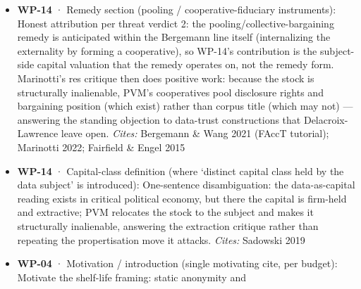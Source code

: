\documentclass[
  11pt,
]{article}
\begin{document}
\begin{itemize}
  partially vindicating the ban pole formally (Acemoglu et al.); firms
  exploit externalities via designed disclosure (Ichihashi); refereed
  precedent exists for externality-adjusted payments to subjects
  covering both local and collectively-imposed losses (Fallah et al.).
  Gu's result --- reducing intermediary bargaining power protects
  privacy without the welfare loss of prohibition --- is the remedy
  thesis in formal dress (cite as working paper; verify placement before
  camera-ready). Distinguish Ben-Shahar's Pigouvian
  no-subject-compensation frame as a foil: PVM internalises the same
  externality but routes value to subjects via pooled bargaining.
  Optionally add a defensive footnote distinguishing the Garrido-Merchán
  Pigouvian group-privacy surcharge preprint (nearest recent
  instantiation; lacks capital class, R(t), inalienability, rent
  decomposition). \emph{Cites:} Choi, Jeon \& Kim 2019; Acemoglu et
  al.~2022; Ichihashi 2021; Fallah et al.~2024; Gu 2024; Ben-Shahar
  2019; (footnote: Garrido-Merchán 2026, arXiv:2601.08574)
\item
  \textbf{WP-14} · Remedy section (pooling / cooperative-fiduciary
  instruments): Honest attribution per threat verdict 2: the
  pooling/collective-bargaining remedy is anticipated within the
  Bergemann line itself (internalizing the externality by forming a
  cooperative), so WP-14's contribution is the subject-side capital
  valuation that the remedy operates on, not the remedy form.
  Marinotti's res critique then does positive work: because the stock is
  structurally inalienable, PVM's cooperatives pool disclosure rights
  and bargaining position (which exist) rather than corpus title (which
  may not) --- answering the standing objection to data-trust
  constructions that Delacroix-Lawrence leave open. \emph{Cites:}
  Bergemann \& Wang 2021 (FAccT tutorial); Marinotti 2022; Fairfield \&
  Engel 2015
\item
  \textbf{WP-14} · Capital-class definition (where `distinct capital
  class held by the data subject' is introduced): One-sentence
  disambiguation: the data-as-capital reading exists in critical
  political economy, but there the capital is firm-held and extractive;
  PVM relocates the stock to the subject and makes it structurally
  inalienable, answering the extraction critique rather than repeating
  the propertisation move it attacks. \emph{Cites:} Sadowski 2019
\item
  \textbf{WP-04} · Motivation / introduction (single motivating cite,
  per budget): Motivate the shelf-life framing: static anonymity and

\end{itemize}
\end{document}

